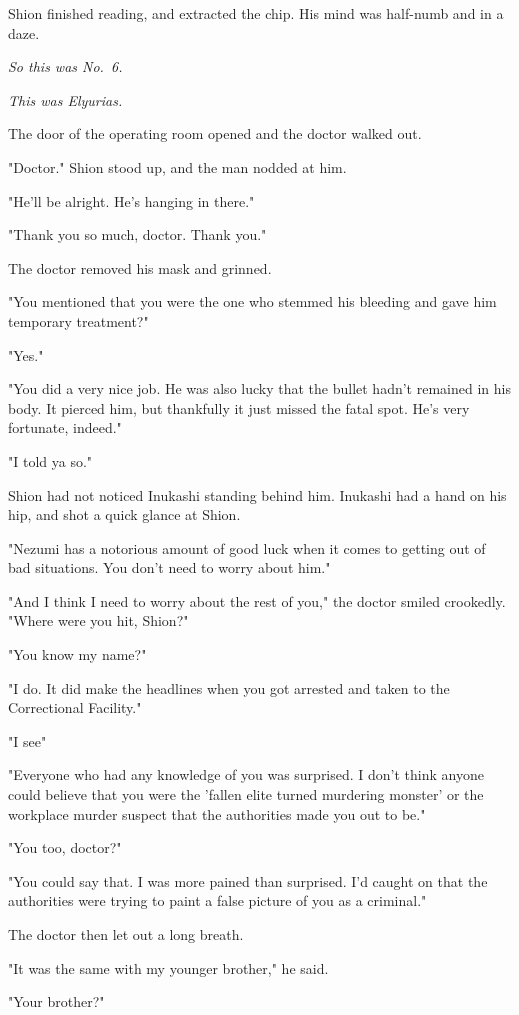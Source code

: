 Shion finished reading, and extracted the chip. His mind was half-numb
and in a daze.

\emph{So this was No.~6.}

\emph{This was Elyurias.}

The door of the operating room opened and the doctor walked out.

"Doctor." Shion stood up, and the man nodded at him.

"He'll be alright. He's hanging in there."

"Thank you so much, doctor. Thank you."

The doctor removed his mask and grinned.

"You mentioned that you were the one who stemmed his bleeding and gave
him temporary treatment?"

"Yes."

"You did a very nice job. He was also lucky that the bullet hadn't
remained in his body. It pierced him, but thankfully it just missed the
fatal spot. He's very fortunate, indeed."

"I told ya so."

Shion had not noticed Inukashi standing behind him. Inukashi had a hand
on his hip, and shot a quick glance at Shion.

"Nezumi has a notorious amount of good luck when it comes to getting out
of bad situations. You don't need to worry about him."

"And I think I need to worry about the rest of you," the doctor smiled
crookedly. "Where were you hit, Shion?"

"You know my name?"

"I do. It did make the headlines when you got arrested and taken to the
Correctional Facility."

"I see\el "

"Everyone who had any knowledge of you was surprised. I don't think
anyone could believe that you were the 'fallen elite turned murdering
monster' or the workplace murder suspect that the authorities made you
out to be."

"You too, doctor?"

"You could say that. I was more pained than surprised. I'd caught on
that the authorities were trying to paint a false picture of you as a
criminal."

The doctor then let out a long breath.

"It was the same with my younger brother," he said.

"Your brother?"

